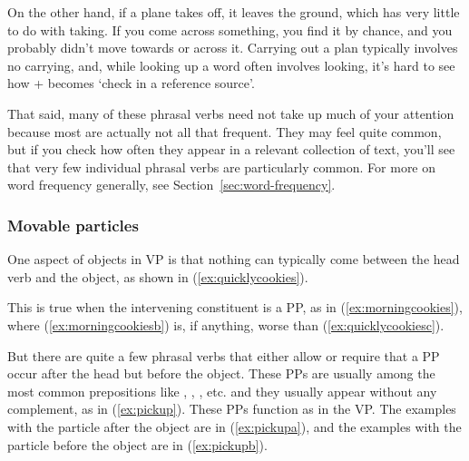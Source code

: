 On the other hand, if a plane takes off, it leaves the ground, which has very
little to do with taking. If you come across something, you find it by chance,
and you probably didn't move towards or across it. Carrying out a plan typically
involves no carrying, and, while looking up a word often involves looking, it's
hard to see how  +  becomes `check in a reference source'.

That said, many of these phrasal verbs need not take up much of your attention
because most are actually not all that frequent. They may feel quite common, but
if you check how often they appear in a relevant collection of text, you'll see that
very few individual phrasal verbs are particularly common. For more on word
frequency generally, see Section~\ref{sec:word-frequency}.

\subsubsection*{Movable particles}

One aspect of objects in VP is that nothing can typically come between the head verb and the object, as shown in (\ref{ex:quicklycookies}).

\ea
    \label{ex:quicklycookiesa}
    \label{ex:quicklycookiesb}
    \label{ex:quicklycookiesc}
    \label{ex:quicklycookiesd}
    \z\label{ex:quicklycookies}
\z
\noindent
This is true when the intervening constituent  is a PP, as in  (\ref{ex:morningcookies}), where (\ref{ex:morningcookiesb}) is, if anything, worse than (\ref{ex:quicklycookiesc}).

\ea
    \label{ex:morningcookiesa}
    \label{ex:morningcookiesb}
    \label{ex:morningcookiesd}
    \z\label{ex:morningcookies}
\z
But there are quite a few phrasal verbs that either allow or require that a PP occur after the head but before the object. These PPs are usually among the most common prepositions like , , , etc. and they usually appear without any complement, as in (\ref{ex:pickup}). These PPs function as  in the VP. The examples with the particle after the object are in (\ref{ex:pickupa}), and the examples with the particle before the object are in (\ref{ex:pickupb}).

